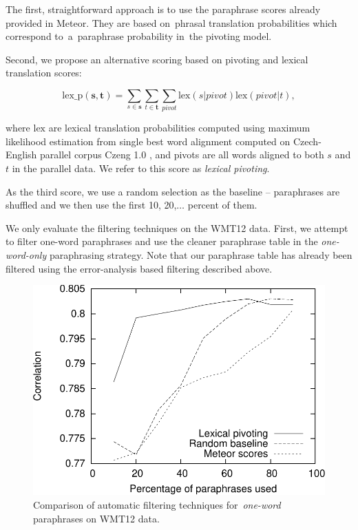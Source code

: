 The first, straightforward approach is to use the paraphrase scores already provided in Meteor. 
They are based on~phrasal translation probabilities which correspond to~a~paraphrase probability in~the pivoting model.

Second, we propose an alternative scoring based on pivoting and lexical translation scores:

$$\text{lex\_p}(\mathbf{s},\mathbf{t}) = \sum_{s \in \mathbf{s}}\sum_{t \in
\mathbf{t}}\sum_{pivot}\text{lex}(s|pivot)\text{lex}(pivot|t),$$

where $\text{lex}$ are lexical translation probabilities computed using maximum likelihood estimation from single best word alignment computed on
Czech-English parallel corpus Czeng 1.0 \citep{czeng10:lrec2012}, and pivots  are all words aligned to both $s$ and $t$ in the parallel data. 
We refer to this score as \emph{lexical pivoting}.

As the third score, we use a random selection as the baseline -- paraphrases are shuffled and we then use the first 10, 20,$\ldots$ percent of them.

We only evaluate the filtering techniques on the WMT12 data. 
First, we attempt to filter one-word paraphrases and use the cleaner paraphrase table in the \emph{one-word-only} paraphrasing strategy. 
Note that our paraphrase table has already been filtered using the error-analysis based filtering described above.

\begin{figure}[tb]
\begin{center}
\includegraphics[scale=0.55]{../img/filtering-lexical-cropped.pdf}
\caption{Comparison of automatic filtering techniques for~\emph{one-word} paraphrases on WMT12 data.}
\label{fig:filtering-lexical}
\end{center}
\end{figure}


